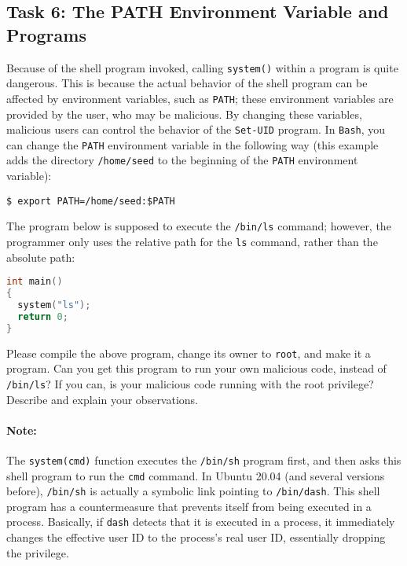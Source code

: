 \subsection{Task 6: The PATH Environment Variable and \setuid Programs}

Because of the shell program invoked, calling {\tt system()}
within a \setuid program is quite dangerous. This is because the actual behavior of the
shell program can be affected by environment variables, such
as {\tt PATH}; these environment variables are provided by the user, who
may be malicious.  By changing these variables, malicious users can control
the behavior of the {\tt Set-UID} program. In {\tt Bash}, you can
change the {\tt PATH} environment variable in the following way (this example
adds the directory {\tt /home/seed} to the beginning of the {\tt PATH} environment variable):


\begin{lstlisting}
$ export PATH=/home/seed:$PATH
\end{lstlisting}



The \setuid program below is supposed to execute the {\tt /bin/ls} command;
however, the programmer only uses the relative path for the {\tt ls}
command, rather than the absolute path:

\begin{lstlisting}[language=C]
int main()
{
  system("ls");
  return 0;
}
\end{lstlisting}

Please compile the above program, change its owner to {\tt root}, and
make it a \setuid program.  Can you get this \setuid program to
run your own malicious code, instead of
{\tt /bin/ls}?  If you can, is your malicious code running with the root privilege?
Describe and explain your observations. \\


\paragraph{Note:}
The \texttt{system(cmd)} function executes the \texttt{/bin/sh} program first, and then
asks this shell program to run the \texttt{cmd} command.
In Ubuntu 20.04 (and several versions before), \texttt{/bin/sh} is actually
a symbolic link pointing to \texttt{/bin/dash}.
This shell program has a countermeasure that prevents itself
from being executed in a \setuid process.  Basically, if \texttt{dash} detects that it is
executed in a \setuid process, it immediately changes the effective user ID to the process's
real user ID, essentially dropping the privilege.


